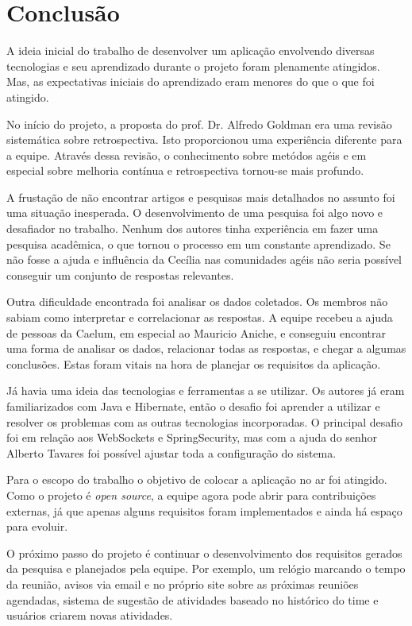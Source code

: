 \section{Conclusão}

A ideia inicial do trabalho de desenvolver um aplicação envolvendo diversas tecnologias e seu aprendizado durante o projeto foram plenamente atingidos. Mas, as expectativas iniciais do aprendizado eram menores do que o que foi atingido.

No início do projeto, a proposta do prof. Dr. Alfredo Goldman era uma revisão sistemática sobre retrospectiva. Isto proporcionou uma experiência diferente para a equipe. Através dessa revisão, o conhecimento sobre metódos agéis e em especial sobre melhoria contínua e retrospectiva tornou-se mais profundo.

A frustação de não encontrar artigos e pesquisas mais detalhados no assunto foi uma situação inesperada. O desenvolvimento de uma pesquisa foi algo novo e desafiador no trabalho. Nenhum dos autores tinha experiência em fazer uma pesquisa acadêmica, o que tornou o processo em um constante aprendizado. Se não fosse a ajuda e influência da Cecília nas comunidades agéis não seria possível conseguir um conjunto de respostas relevantes.

Outra dificuldade encontrada foi analisar os dados coletados. Os membros não sabiam como interpretar e correlacionar as respostas. A equipe recebeu a ajuda de pessoas da Caelum, em especial ao Mauricio Aniche, e conseguiu encontrar uma forma de analisar os dados, relacionar todas as respostas, e chegar a algumas conclusões. Estas foram vitais na hora de planejar os requisitos da aplicação.

Já havia uma ideia das tecnologias e ferramentas a se utilizar. Os autores já eram familiarizados com Java e Hibernate, então o desafio foi aprender a utilizar e resolver os problemas com as outras tecnologias incorporadas. O principal desafio foi em relação aos WebSockets e SpringSecurity, mas com a ajuda do senhor Alberto Tavares foi possível ajustar toda a configuração do sistema. 

Para o escopo do trabalho o objetivo de colocar a aplicação no ar foi atingido. Como o projeto é \textit{open source}, a equipe agora pode abrir para contribuições externas, já que apenas alguns requisitos foram implementados e ainda há espaço para evoluir.  

O próximo passo do projeto é continuar o desenvolvimento dos requisitos gerados da pesquisa e planejados pela equipe. Por exemplo, um relógio marcando o tempo da reunião, avisos via email e no próprio site sobre as próximas reuniões agendadas, sistema de sugestão de atividades baseado no histórico do time e  usuários criarem novas atividades.

